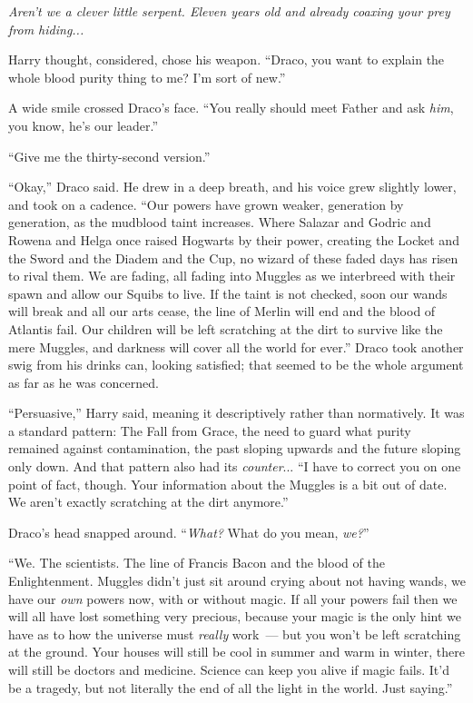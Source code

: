 \emph{Aren't we a clever little serpent. Eleven years old and already coaxing your prey from hiding...}

Harry thought, considered, chose his weapon. ``Draco, you want to explain the whole blood purity thing to me? I'm sort of new.''

A wide smile crossed Draco's face. ``You really should meet Father and ask \emph{him}, you know, he's our leader.''

``Give me the thirty-second version.''

``Okay,'' Draco said. He drew in a deep breath, and his voice grew slightly lower, and took on a cadence. ``Our powers have grown weaker, generation by generation, as the mudblood taint increases. Where Salazar and Godric and Rowena and Helga once raised Hogwarts by their power, creating the Locket and the Sword and the Diadem and the Cup, no wizard of these faded days has risen to rival them. We are fading, all fading into Muggles as we interbreed with their spawn and allow our Squibs to live. If the taint is not checked, soon our wands will break and all our arts cease, the line of Merlin will end and the blood of Atlantis fail. Our children will be left scratching at the dirt to survive like the mere Muggles, and darkness will cover all the world for ever.'' Draco took another swig from his drinks can, looking satisfied; that seemed to be the whole argument as far as he was concerned.

``Persuasive,'' Harry said, meaning it descriptively rather than normatively. It was a standard pattern: The Fall from Grace, the need to guard what purity remained against contamination, the past sloping upwards and the future sloping only down. And that pattern also had its \emph{counter}... ``I have to correct you on one point of fact, though. Your information about the Muggles is a bit out of date. We aren't exactly scratching at the dirt anymore.''

Draco's head snapped around. ``\emph{What?} What do you mean, \emph{we?}''

``We. The scientists. The line of Francis Bacon and the blood of the Enlightenment. Muggles didn't just sit around crying about not having wands, we have our \emph{own} powers now, with or without magic. If all your powers fail then we will all have lost something very precious, because your magic is the only hint we have as to how the universe must \emph{really} work~--- but you won't be left scratching at the ground. Your houses will still be cool in summer and warm in winter, there will still be doctors and medicine. Science can keep you alive if magic fails. It'd be a tragedy, but not literally the end of all the light in the world. Just saying.''

